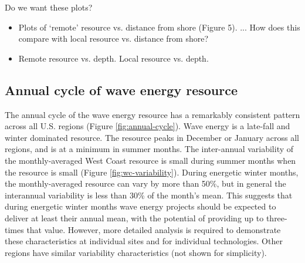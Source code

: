 
Do we want these plots?
\begin{itemize}
\item Plots of ‘remote’ resource vs. distance from shore (Figure 5). ... How does this compare with local resource vs. distance from shore?
\item Remote resource vs. depth. Local resource vs. depth.
\end{itemize}

\subsection{Annual cycle of wave energy resource}

The annual cycle of the wave energy resource has a remarkably consistent pattern across all U.S. regions (Figure \ref{fig:annual-cycle}). Wave energy is a late-fall and winter dominated resource. The resource peaks in December or January across all regions, and is at a minimum in summer months. The inter-annual variability of the monthly-averaged West Coast resource is small during summer months when the resource is small (Figure \ref{fig:wc-variability}). During energetic winter months, the monthly-averaged resource can vary by more than 50\%, but in general the interannual variability is less than 30\% of the month's mean. This suggests that during energetic winter months wave energy projects should be expected to deliver at least their annual mean, with the potential of providing up to three-times that value.  However, more detailed analysis is required to demonstrate these characteristics at individual sites and for individual technologies. Other regions have similar variability characteristics (not shown for simplicity).

